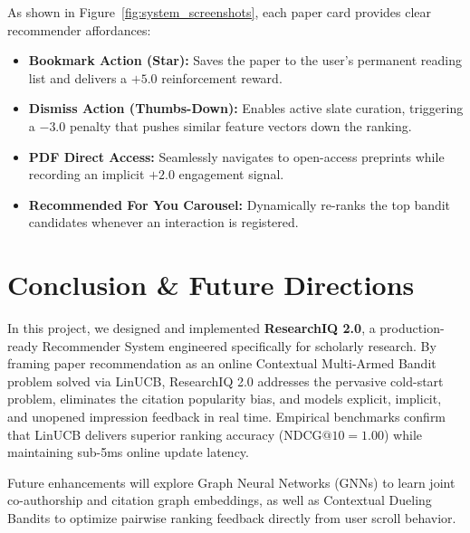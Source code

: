 \documentclass[11pt,a4paper]{article}
\begin{document}
As shown in Figure~\ref{fig:system_screenshots}, each paper card provides clear recommender affordances:
\begin{itemize}[leftmargin=1.5em]
    \item \textbf{Bookmark Action (Star):} Saves the paper to the user's permanent reading list and delivers a $+5.0$ reinforcement reward.
    \item \textbf{Dismiss Action (Thumbs-Down):} Enables active slate curation, triggering a $-3.0$ penalty that pushes similar feature vectors down the ranking.
    \item \textbf{PDF Direct Access:} Seamlessly navigates to open-access preprints while recording an implicit $+2.0$ engagement signal.
    \item \textbf{Recommended For You Carousel:} Dynamically re-ranks the top bandit candidates whenever an interaction is registered.
\end{itemize}

\section{Conclusion \& Future Directions}

In this project, we designed and implemented \textbf{ResearchIQ 2.0}, a production-ready Recommender System engineered specifically for scholarly research. By framing paper recommendation as an online Contextual Multi-Armed Bandit problem solved via LinUCB, ResearchIQ 2.0 addresses the pervasive cold-start problem, eliminates the citation popularity bias, and models explicit, implicit, and unopened impression feedback in real time. Empirical benchmarks confirm that LinUCB delivers superior ranking accuracy ($\text{NDCG@10} = 1.00$) while maintaining sub-5ms online update latency.

Future enhancements will explore Graph Neural Networks (GNNs) to learn joint co-authorship and citation graph embeddings, as well as Contextual Dueling Bandits to optimize pairwise ranking feedback directly from user scroll behavior.
\end{document}
